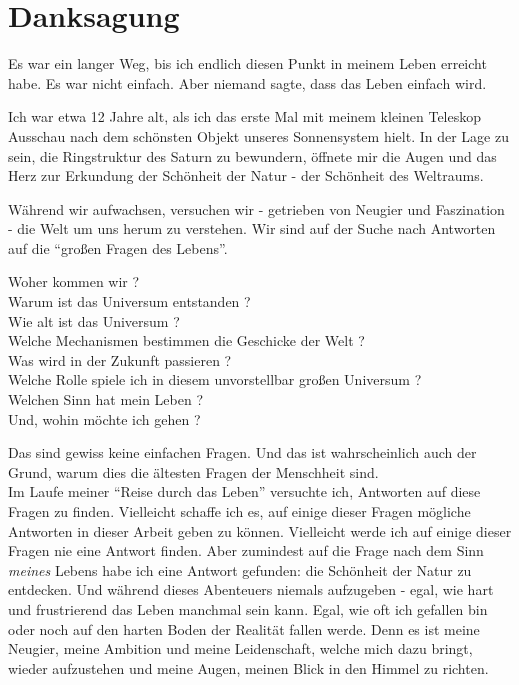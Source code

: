 \chapter*{Danksagung}

\noindent Es war ein langer Weg, bis ich endlich diesen Punkt in meinem Leben erreicht habe. Es war nicht einfach. Aber niemand sagte, dass das Leben einfach wird.

\noindent Ich war etwa 12 Jahre alt, als ich das erste Mal mit meinem kleinen Teleskop Ausschau nach dem schönsten Objekt unseres Sonnensystem hielt. In der Lage zu sein, die Ringstruktur des Saturn zu bewundern, öffnete mir die Augen und das Herz zur Erkundung der Schönheit der Natur - der Schönheit des Weltraums.

Während wir aufwachsen, versuchen wir - getrieben von Neugier und Faszination - die Welt um uns herum zu verstehen. Wir sind auf der Suche nach Antworten auf die ``großen Fragen des Lebens''.

\noindent Woher kommen wir ? \\
Warum ist das Universum entstanden ? \\
Wie alt ist das Universum ? \\
Welche Mechanismen bestimmen die Geschicke der Welt ? \\
Was wird in der Zukunft passieren ? \\
Welche Rolle spiele ich in diesem unvorstellbar großen Universum ? \\
Welchen Sinn hat mein Leben ? \\
Und, wohin möchte ich gehen ? 

\noindent Das sind gewiss keine einfachen Fragen. Und das ist wahrscheinlich auch der Grund, warum dies die ältesten Fragen der Menschheit sind. \\
Im Laufe meiner ``Reise durch das Leben'' versuchte ich, Antworten auf diese Fragen zu finden. Vielleicht schaffe ich es, auf einige dieser Fragen mögliche Antworten in dieser Arbeit geben zu können. Vielleicht werde ich auf einige dieser Fragen nie eine Antwort finden.
Aber zumindest auf die Frage nach dem Sinn \textit{meines} Lebens habe ich eine Antwort gefunden: die Schönheit der Natur zu entdecken. Und während dieses Abenteuers niemals aufzugeben - egal, wie hart und frustrierend das Leben manchmal sein kann. Egal, wie oft ich gefallen bin oder noch auf den harten Boden der Realität fallen werde. Denn es ist meine Neugier, meine Ambition und meine Leidenschaft, welche mich dazu bringt, wieder aufzustehen und meine Augen, meinen Blick in den Himmel zu richten.

